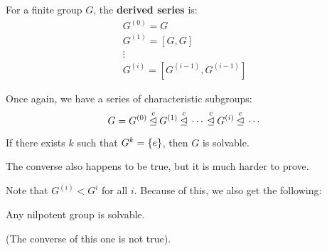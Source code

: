 \begin{defn}
    For a finite group $ G $, the \textbf{derived series} is:
    \begin{gather*}
        G^{(0)} = G \\
        G^{(1)} = [G, G] \\
        \vdots \\
        G^{(i)} = [G^{(i-1)}, G^{(i-1)}]
    \end{gather*}
\end{defn}
Once again, we have a series of characteristic subgroups:
\begin{equation*}
    G = G^{(0)} \: \overset{c}{\operatorname{\trianglelefteq}} \: G^{(1)} \: \overset{c}{\operatorname{\trianglelefteq}} \: \cdots \: \overset{c}{\operatorname{\trianglelefteq}} \: G^{(i)} \: \overset{c}{\operatorname{\trianglelefteq}} \: \cdots
\end{equation*}

\begin{lm}
    If there exists $ k $ such that $ G^{k} = \left\{{e}\right\} $, then $ G $ is solvable.
\end{lm}
The converse also happens to be true, but it is much harder to prove.

Note that $ G^{(i)} < G^{i} $ for all $ i $. Because of this, we also get the following:
\begin{crll}
    Any nilpotent group is solvable.
\end{crll}
(The converse of this one is not true).

